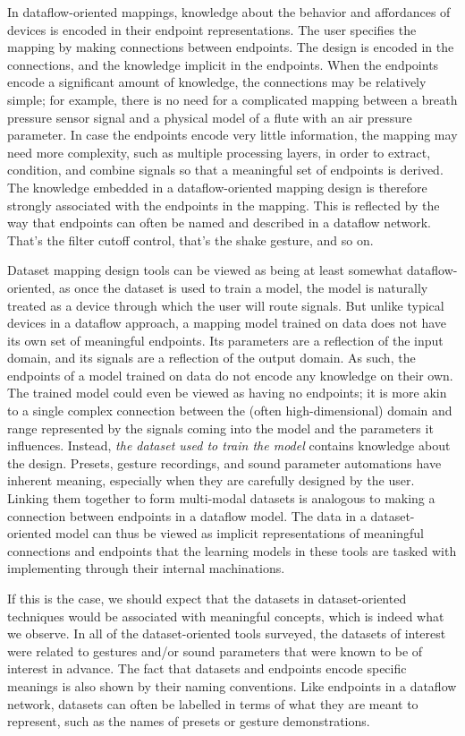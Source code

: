 \documentclass[main.tex]{subfiles}
\begin{document}
In dataflow-oriented mappings, knowledge about the behavior and affordances of
devices is encoded in their endpoint representations.  The user specifies the
mapping by making connections between endpoints.  The design is encoded in the
connections, and the knowledge implicit in the endpoints.  When the endpoints
encode a significant amount of knowledge, the connections may be relatively
simple; for example, there is no need for a complicated mapping between a
breath pressure sensor signal and a physical model of a flute with an air
pressure parameter.  In case the endpoints encode very little information, the
mapping may need more complexity, such as multiple processing layers, in order
to extract, condition, and combine signals so that a meaningful set of
endpoints is derived.  The knowledge embedded in a dataflow-oriented mapping
design is therefore strongly associated with the endpoints in the mapping.
This is reflected by the way that endpoints can often be named and described
in a dataflow network. That's the filter cutoff control, that's the shake gesture,
and so on.

Dataset mapping design tools can be viewed as being at least somewhat
dataflow-oriented, as once the dataset is used to train a model, the model is
naturally treated as a device through which the user will route signals. But
unlike typical devices in a dataflow approach, a mapping model trained on data
does not have its own set of meaningful endpoints. Its parameters are a
reflection of the input domain, and its signals are a reflection of the output
domain. As such, the endpoints of a model trained on data do not encode any
knowledge on their own. The trained model could even be viewed as having no
endpoints; it is more akin to a single complex connection between the (often
high-dimensional) domain and range represented by the signals coming into the
model and the parameters it influences. Instead, \emph{the dataset used to
train the model} contains knowledge about the design. Presets, gesture
recordings, and sound parameter automations have inherent meaning, especially
when they are carefully designed by the user. Linking them together to form
multi-modal datasets is analogous to making a connection between endpoints in a
dataflow model. The data in a dataset-oriented model can thus be viewed as
implicit representations of meaningful connections and endpoints that the
learning models in these tools are tasked with implementing through their
internal machinations.

If this is the case, we should expect that the datasets in dataset-oriented
techniques would be associated with meaningful concepts, which is indeed what
we observe.  In all of the dataset-oriented tools surveyed, the datasets of
interest were related to gestures and/or sound parameters that were known to be
of interest in advance. The fact that datasets and endpoints encode specific
meanings is also shown by their naming conventions. Like endpoints in a dataflow
network, datasets can often be labelled in terms of what they are meant
to represent, such as the names of presets or gesture demonstrations.
\end{document}
